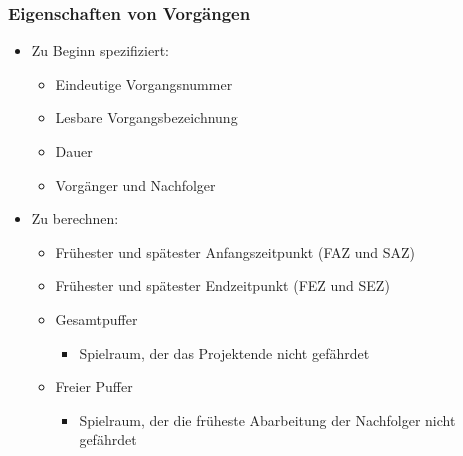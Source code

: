 \documentclass[ngerman, t]{beamer}
\begin{document}
\begin{frame}
  \frametitle{Eigenschaften von Vorg\"angen}
  \begin{itemize}
    \item Zu Beginn spezifiziert:
      \begin{itemize}
        \item Eindeutige Vorgangsnummer
        \item Lesbare Vorgangsbezeichnung
        \item Dauer
        \item Vorg\"anger und Nachfolger
      \end{itemize}
    \item Zu berechnen:
      \begin{itemize}
        \item Fr\"uhester und sp\"atester Anfangszeitpunkt (FAZ und SAZ)
        \item Fr\"uhester und sp\"atester Endzeitpunkt (FEZ und SEZ)
        \item Gesamtpuffer
          \begin{itemize}
            \item Spielraum, der das Projektende nicht gef\"ahrdet
          \end{itemize}
        \item Freier Puffer
          \begin{itemize}
            \item Spielraum, der die fr\"uheste Abarbeitung der Nachfolger
              nicht gef\"ahrdet
          \end{itemize}
      \end{itemize}
  \end{itemize}
\end{frame}
\end{document}
